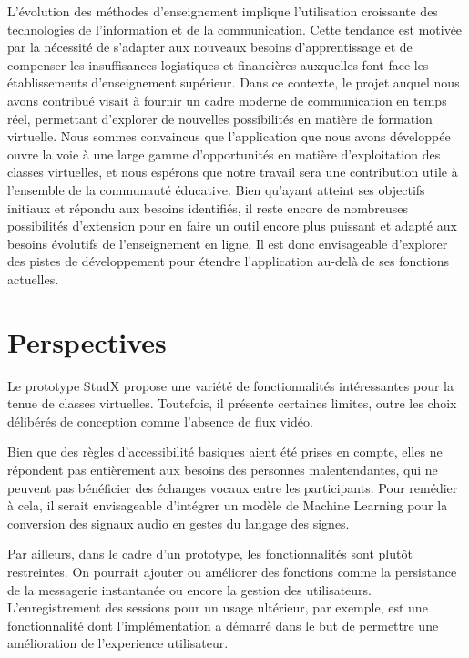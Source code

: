 \conclusion
L'évolution des méthodes d'enseignement implique l'utilisation croissante des technologies de l'information et de la communication. 
Cette tendance est motivée par la nécessité de s'adapter aux nouveaux besoins d'apprentissage et de compenser les insuffisances logistiques et 
financières auxquelles font face les établissements d'enseignement supérieur. Dans ce contexte, 
le projet auquel nous avons contribué visait à fournir un cadre moderne de communication en temps réel, 
permettant d'explorer de nouvelles possibilités en matière de formation virtuelle. 
Nous sommes convaincus que l'application que nous avons développée ouvre la voie à une large gamme d'opportunités en matière d'exploitation des classes virtuelles, 
et nous espérons que notre travail sera une contribution utile à l'ensemble de la communauté éducative.  
Bien qu'ayant atteint ses objectifs initiaux et répondu aux besoins identifiés, il reste encore de nombreuses possibilités d'extension pour en faire un outil encore plus puissant et adapté aux besoins évolutifs de l'enseignement en ligne. 
Il est donc envisageable d'explorer des pistes de développement pour étendre l'application au-delà de ses fonctions actuelles.

\section*{Perspectives}
Le prototype StudX propose une variété de fonctionnalités intéressantes pour la tenue de classes virtuelles.  
Toutefois, il présente certaines limites, outre les choix délibérés de conception comme l’absence de flux vidéo. 

Bien que des règles d'accessibilité basiques aient été prises en compte, elles ne répondent pas entièrement aux 
besoins des personnes malentendantes, qui ne peuvent pas bénéficier des échanges vocaux entre les participants. 
Pour remédier à cela, il serait envisageable d'intégrer un modèle de Machine Learning pour la conversion des signaux 
audio en gestes du langage des signes.

Par ailleurs, dans le cadre d’un prototype, les fonctionnalités sont plutôt restreintes. 
On pourrait ajouter ou améliorer des fonctions comme la persistance de la messagerie instantanée ou 
encore la gestion des utilisateurs. L'enregistrement des sessions pour un usage ultérieur, par exemple, est une fonctionnalité
dont l'implémentation a démarré dans le but de permettre une amélioration de l'experience utilisateur.